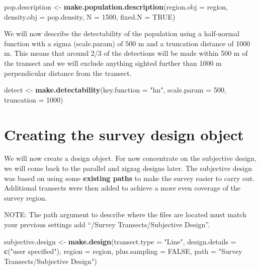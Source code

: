 \documentclass[]{book}
\newenvironment{Shaded}{\begin{snugshade}}{\end{snugshade}}
\newcommand{\KeywordTok}[1]{\textcolor[rgb]{0.13,0.29,0.53}{\textbf{#1}}}
\newcommand{\DataTypeTok}[1]{\textcolor[rgb]{0.13,0.29,0.53}{#1}}
\newcommand{\DecValTok}[1]{\textcolor[rgb]{0.00,0.00,0.81}{#1}}
\newcommand{\StringTok}[1]{\textcolor[rgb]{0.31,0.60,0.02}{#1}}
\newcommand{\OtherTok}[1]{\textcolor[rgb]{0.56,0.35,0.01}{#1}}
\newcommand{\NormalTok}[1]{#1}
\theoremstyle{definition}
\theoremstyle{definition}
\theoremstyle{remark}
\begin{document}
\begin{Shaded}
\begin{Highlighting}[]
\NormalTok{pop.description <-}\StringTok{ }\KeywordTok{make.population.description}\NormalTok{(}\DataTypeTok{region.obj =}\NormalTok{ region, }
                                               \DataTypeTok{density.obj =}\NormalTok{ pop.density, }
                                               \DataTypeTok{N =} \DecValTok{1500}\NormalTok{, }\DataTypeTok{fixed.N =} \OtherTok{TRUE}\NormalTok{)}
\end{Highlighting}
\end{Shaded}

We will now describe the detectability of the population using a
half-normal function with a sigma (scale.param) of 500 m and a
truncation distance of 1000 m. This means that around 2/3 of the
detections will be made within 500 m of the transect and we will exclude
anything sighted further than 1000 m perpendicular distance from the
transect.

\begin{Shaded}
\begin{Highlighting}[]
\NormalTok{detect <-}\StringTok{ }\KeywordTok{make.detectability}\NormalTok{(}\DataTypeTok{key.function =} \StringTok{"hn"}\NormalTok{, }\DataTypeTok{scale.param =} \DecValTok{500}\NormalTok{, }\DataTypeTok{truncation =} \DecValTok{1000}\NormalTok{)}
\end{Highlighting}
\end{Shaded}

\section{Creating the survey design
object}\label{creating-the-survey-design-object}

We will now create a design object. For now concentrate on the
subjective design, we will come back to the parallel and zigzag designs
later. The subjective design was based on using some \textbf{existing
paths} to make the survey easier to carry out. Additional transects were
then added to achieve a more even coverage of the survey region.

NOTE: The path argument to describe where the files are located must
match your previous settings add ``/Survey Transects/Subjective
Design''.

\begin{Shaded}
\begin{Highlighting}[]
\NormalTok{subjective.design <-}\StringTok{ }\KeywordTok{make.design}\NormalTok{(}\DataTypeTok{transect.type =} \StringTok{"Line"}\NormalTok{, }
                                 \DataTypeTok{design.details =} \KeywordTok{c}\NormalTok{(}\StringTok{"user specified"}\NormalTok{), }
                                 \DataTypeTok{region =}\NormalTok{ region, }
                                 \DataTypeTok{plus.sampling =} \OtherTok{FALSE}\NormalTok{, }
                                 \DataTypeTok{path =} \StringTok{"Survey Transects/Subjective Design"}\NormalTok{)}
\end{Highlighting}
\end{Shaded}
\end{document}
